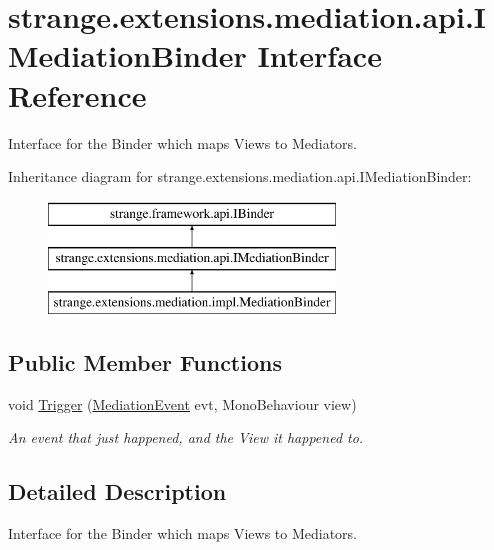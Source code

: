\hypertarget{interfacestrange_1_1extensions_1_1mediation_1_1api_1_1_i_mediation_binder}{\section{strange.\-extensions.\-mediation.\-api.\-I\-Mediation\-Binder Interface Reference}
\label{interfacestrange_1_1extensions_1_1mediation_1_1api_1_1_i_mediation_binder}
}


Interface for the Binder which maps Views to Mediators.  


Inheritance diagram for strange.\-extensions.\-mediation.\-api.\-I\-Mediation\-Binder\-:\begin{figure}[H]
\begin{center}
\leavevmode
\includegraphics[height=3.000000cm]{interfacestrange_1_1extensions_1_1mediation_1_1api_1_1_i_mediation_binder}
\end{center}
\end{figure}
\subsection*{Public Member Functions}
\begin{DoxyCompactItemize}
\item 
void \hyperlink{interfacestrange_1_1extensions_1_1mediation_1_1api_1_1_i_mediation_binder_ab1c50a1f20201998387c002c286599bf}{Trigger} (\hyperlink{namespacestrange_1_1extensions_1_1mediation_1_1api_ae5a81bb1edf9fca1d2aca9f4fada72a8}{Mediation\-Event} evt, Mono\-Behaviour view)
\begin{DoxyCompactList}\small\item\em An event that just happened, and the View it happened to. \end{DoxyCompactList}\end{DoxyCompactItemize}


\subsection{Detailed Description}
Interface for the Binder which maps Views to Mediators. 

